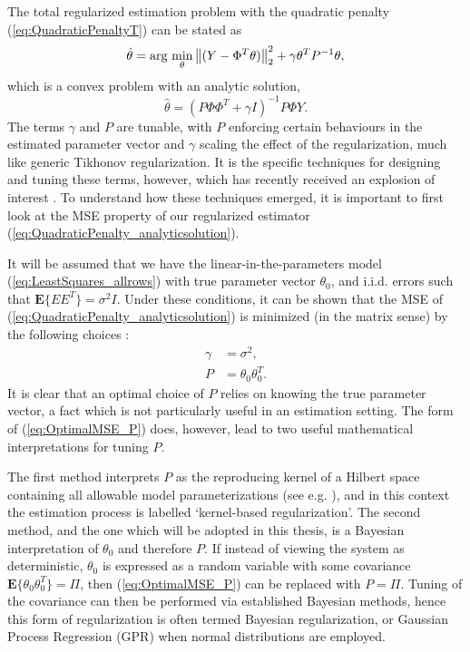 The total regularized estimation problem with the quadratic penalty (\ref{eq:QuadraticPenaltyT}) can be stated as
\begin{equation}
\hat{\theta} = \text{arg } \underset{\theta}{\text{min}} \left\lVert(Y-\Phi^T \theta)\right\rVert_2^2 + \gamma \theta^T P^{-1} \theta,
\label{eq:Estimator_QuadraticPenalty}
\end{equation} 
which is a convex problem with an analytic solution,
\begin{equation}
\hat{\theta} = (P \Phi \Phi^T + \gamma I)^{-1} P \Phi Y.
\label{eq:QuadraticPenalty_analyticsolution}
\end{equation} 
The terms $\gamma$ and $P$ are tunable, with $P$ enforcing certain behaviours in the estimated parameter vector and $\gamma$ scaling the effect of the regularization, much like generic Tikhonov regularization. It is the specific techniques for designing and tuning these terms, however, which has recently received an explosion of interest \cite{Pillonetto2014}. To understand how these techniques emerged, it is important to first look at the MSE property of our regularized estimator (\ref{eq:QuadraticPenalty_analyticsolution}).

It will be assumed that we have the linear-in-the-parameters model (\ref{eq:LeastSquares_allrows}) with true parameter vector $\theta_0$, and i.i.d. errors such that $\mathbf{E} \{ EE^T \} = \sigma^2 I$. Under these conditions, it can be shown that the MSE of (\ref{eq:QuadraticPenalty_analyticsolution}) is minimized (in the matrix sense) by the following choices \cite{Chen2012}:
\begin{align}
\gamma &= \sigma^2, \\
P &= \theta_0 \theta_0^T. \label{eq:OptimalMSE_P}
\end{align}
It is clear that an optimal choice of $P$ relies on knowing the true parameter vector, a fact which is not particularly useful in an estimation setting. The form of (\ref{eq:OptimalMSE_P}) does, however, lead to two useful mathematical interpretations for tuning $P$. 

The first method interprets $P$ as the reproducing kernel of a Hilbert space containing all allowable model parameterizations (see e.g. \cite{Scholkopf2001}), and in this context the estimation process is labelled `kernel-based regularization'. The second method, and the one which will be adopted in this thesis, is a Bayesian interpretation of $\theta_0$ and therefore $P$. If instead of viewing the system as deterministic, $\theta_0$ is expressed as a random variable with some covariance $\mathbf{E} \{ \theta_0 \theta_0^T\} = \Pi$, then (\ref{eq:OptimalMSE_P}) can be replaced with $P = \Pi$. Tuning of the covariance can then be performed via established Bayesian methods, hence this form of regularization is often termed Bayesian regularization, or Gaussian Process Regression (GPR) when normal distributions are employed.

